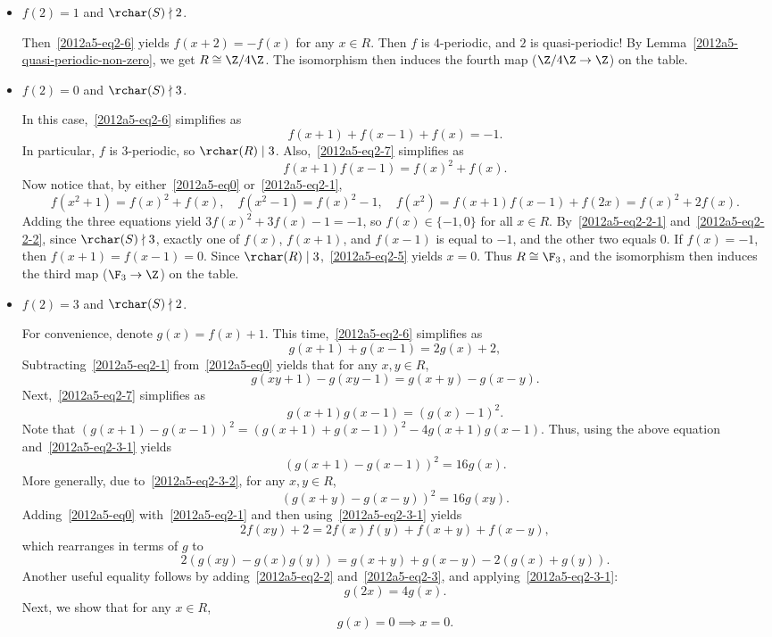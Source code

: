 \begin{itemize}

    \item 
    $f(2) = 1$ and $\rchar(S) \nmid 2$.

    Then~\eqref{2012a5-eq2-6} yields $f(x + 2) = -f(x)$ for any $x \in R$.
    Then $f$ is $4$-periodic, and $2$ is quasi-periodic!
    By Lemma~\ref{2012a5-quasi-periodic-non-zero}, we get $R \cong \Z/4\Z$.
    The isomorphism then induces the fourth map ($\Z/4\Z \to \Z$) on the table.

    \item
    $f(2) = 0$ and $\rchar(S) \nmid 3$.

    In this case,~\eqref{2012a5-eq2-6} simplifies as
    \[ f(x + 1) + f(x - 1) + f(x) = -1. \tag{2.2.1}\label{2012a5-eq2-2-1} \]
    In particular, $f$ is $3$-periodic, so $\rchar(R) \mid 3$.
    Also,~\eqref{2012a5-eq2-7} simplifies as
    \[ f(x + 1) f(x - 1) = f(x)^2 + f(x). \tag{2.2.2}\label{2012a5-eq2-2-2} \]
    Now notice that, by either~\eqref{2012a5-eq0} or~\eqref{2012a5-eq2-1},
    \[ f(x^2 + 1) = f(x)^2 + f(x), \quad f(x^2 - 1) = f(x)^2 - 1, \quad f(x^2) = f(x + 1) f(x - 1) + f(2x) = f(x)^2 + 2 f(x). \]
    Adding the three equations yield $3 f(x)^2 + 3 f(x) - 1 = -1$, so $f(x) \in \{-1, 0\}$ for all $x \in R$.
    By~\eqref{2012a5-eq2-2-1} and~\eqref{2012a5-eq2-2-2}, since $\rchar(S) \nmid 3$, exactly one of $f(x)$, $f(x + 1)$, and $f(x - 1)$ is equal to $-1$, and the other two equals $0$.
    If $f(x) = -1$, then $f(x + 1) = f(x - 1) = 0$.
    Since $\rchar(R) \mid 3$,~\eqref{2012a5-eq2-5} yields $x = 0$.
    Thus $R \cong \F_3$, and the isomorphism then induces the third map ($\F_3 \to \Z$) on the table.

    \item
    $f(2) = 3$ and $\rchar(S) \nmid 2$.

    For convenience, denote $g(x) = f(x) + 1$.
    This time,~\eqref{2012a5-eq2-6} simplifies as
    \[ g(x + 1) + g(x - 1) = 2 g(x) + 2, \tag{2.3.1}\label{2012a5-eq2-3-1} \]
    Subtracting~\eqref{2012a5-eq2-1} from~\eqref{2012a5-eq0} yields that for any $x, y \in R$,
    \[ g(xy + 1) - g(xy - 1) = g(x + y) - g(x - y). \tag{2.3.2}\label{2012a5-eq2-3-2} \]
    Next,~\eqref{2012a5-eq2-7} simplifies as
    \[ g(x + 1) g(x - 1) = (g(x) - 1)^2. \]
    Note that $(g(x + 1) - g(x - 1))^2 = (g(x + 1) + g(x - 1))^2 - 4 g(x + 1) g(x - 1)$.
    Thus, using the above equation and~\eqref{2012a5-eq2-3-1} yields
    \[ (g(x + 1) - g(x - 1))^2 = 16 g(x). \]
    More generally, due to~\eqref{2012a5-eq2-3-2}, for any $x, y \in R$,
    \[ (g(x + y) - g(x - y))^2 = 16 g(xy). \tag{2.3.3}\label{2012a5-eq2-3-3} \]
    Adding~\eqref{2012a5-eq0} with~\eqref{2012a5-eq2-1} and then using~\eqref{2012a5-eq2-3-1} yields
    \[ 2 f(xy) + 2 = 2 f(x) f(y) + f(x + y) + f(x - y), \]
        which rearranges in terms of $g$ to
    \[ 2(g(xy) - g(x) g(y)) = g(x + y) + g(x - y) - 2(g(x) + g(y)). \tag{2.3.4}\label{2012a5-eq2-3-4} \]
    Another useful equality follows by adding~\eqref{2012a5-eq2-2} and~\eqref{2012a5-eq2-3}, and applying~\eqref{2012a5-eq2-3-1}:
    \[ g(2x) = 4 g(x). \tag{2.3.5}\label{2012a5-eq2-3-5} \]
    Next, we show that for any $x \in R$,
    \[ g(x) = 0 \implies x = 0. \tag{2.3.6}\label{2012a5-eq2-3-6} \]


\end{itemize}
